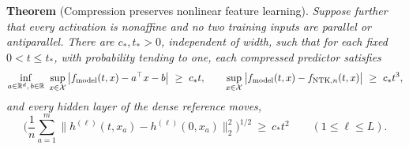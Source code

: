 \documentclass[12pt,border=2pt]{standalone}
\begin{document}
\begin{minipage}{7.1in}
\textbf{Theorem} (Compression preserves nonlinear feature learning).
\textit{Suppose further that every activation is nonaffine and no two training
inputs are parallel or antiparallel. There are $c_*,t_*>0$, independent of
width, such that for each fixed $0<t\le t_*$, with probability tending to one,
each compressed predictor satisfies}
\[
 \inf_{a\in\R^d,\,b\in\R}\ \sup_{x\in\mathcal X}
 \big|f_{\rm model}(t,x)-a^\top x-b\big|\ \ge\ c_*t,
 \qquad
 \sup_{x\in\mathcal X}\big|f_{\rm model}(t,x)-f_{\mathrm{NTK},n}(t,x)\big|\ \ge\ c_*t^3,
\]
\textit{and every hidden layer of the dense reference moves,}
\[
 \Big(\frac1n\sum_{a=1}^m\big\|h^{(\ell)}(t,x_a)-h^{(\ell)}(0,x_a)\big\|_2^2\Big)^{1/2}
 \ \ge\ c_*t^2\qquad(1\le\ell\le L).
\]
\end{minipage}
\end{document}
